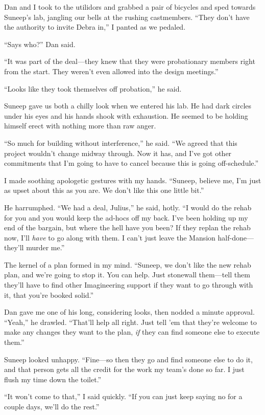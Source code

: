 Dan and I took to the utilidors and grabbed a pair of bicycles and
sped towards Suneep's lab, jangling our bells at the rushing
castmembers. “They don't have the authority to invite Debra in,” I
panted as we pedaled.

“Says who?” Dan said.

“It was part of the deal—they knew that they were probationary
members right from the start. They weren't even allowed into the
design meetings.”

“Looks like they took themselves off probation,” he said.

Suneep gave us both a chilly look when we entered his lab. He had
dark circles under his eyes and his hands shook with exhaustion. He
seemed to be holding himself erect with nothing more than raw
anger.

“So much for building without interference,” he said. “We agreed
that this project wouldn't change midway through. Now it has, and
I've got other commitments that I'm going to have to cancel because
this is going off-schedule.”

I made soothing apologetic gestures with my hands. “Suneep, believe
me, I'm just as upset about this as you are. We don't like this one
little bit.”

He harrumphed. “We had a deal, Julius,” he said, hotly. “I would do
the rehab for you and you would keep the ad-hocs off my back. I've
been holding up my end of the bargain, but where the hell have you
been? If they replan the rehab now, I'll \emph{have} to go along
with them. I can't just leave the Mansion half-done—they'll murder
me.”

The kernel of a plan formed in my mind. “Suneep, we don't like the
new rehab plan, and we're going to stop it. You can help. Just
stonewall them—tell them they'll have to find other Imagineering
support if they want to go through with it, that you're booked
solid.”

Dan gave me one of his long, considering looks, then nodded a
minute approval. “Yeah,” he drawled. “That'll help all right. Just
tell 'em that they're welcome to make any changes they want to the
plan, \emph{if} they can find someone else to execute them.”

Suneep looked unhappy. “Fine—so then they go and find someone else
to do it, and that person gets all the credit for the work my
team's done so far. I just flush my time down the toilet.”

“It won't come to that,” I said quickly. “If you can just keep
saying no for a couple days, we'll do the rest.”

